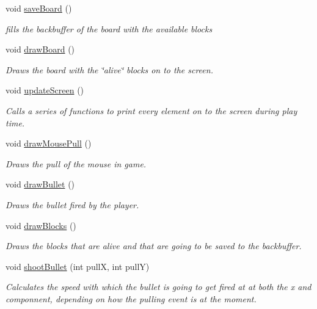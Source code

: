 \begin{DoxyCompactItemize}
void \mbox{\hyperlink{group__game_ga0cf89070294bbf27c335ebf047e0f1f6}{save\+Board}} ()
\begin{DoxyCompactList}\small\item\em fills the backbuffer of the board with the available blocks \end{DoxyCompactList}\item 
void \mbox{\hyperlink{group__game_ga435ba4a0d4fc47fbf7b4e13acaa312e4}{draw\+Board}} ()
\begin{DoxyCompactList}\small\item\em Draws the board with the \char`\"{}alive\char`\"{} blocks on to the screen. \end{DoxyCompactList}\item 
void \mbox{\hyperlink{group__game_ga192a0a30e5705be3b2800eb7172aa6d4}{update\+Screen}} ()
\begin{DoxyCompactList}\small\item\em Calls a series of functions to print every element on to the screen during play time. \end{DoxyCompactList}\item 
void \mbox{\hyperlink{group__game_ga072809b49225566117672a2ec734b2cc}{draw\+Mouse\+Pull}} ()
\begin{DoxyCompactList}\small\item\em Draws the pull of the mouse in game. \end{DoxyCompactList}\item 
void \mbox{\hyperlink{group__game_ga43d711f5646009700e97e8cce499d5fc}{draw\+Bullet}} ()
\begin{DoxyCompactList}\small\item\em Draws the bullet fired by the player. \end{DoxyCompactList}\item 
void \mbox{\hyperlink{group__game_ga172749cfe0f9091767c74e3004188ffc}{draw\+Blocks}} ()
\begin{DoxyCompactList}\small\item\em Draws the blocks that are alive and that are going to be saved to the backbuffer. \end{DoxyCompactList}\item 
void \mbox{\hyperlink{group__game_ga8aa45a2e3dda0d09a4002eb399e587a9}{shoot\+Bullet}} (int pullX, int pullY)
\begin{DoxyCompactList}\small\item\em Calculates the speed with which the bullet is going to get fired at at both the x and componnent, depending on how the pulling event is at the moment. \end{DoxyCompactList}\item 

\end{DoxyCompactItemize}
